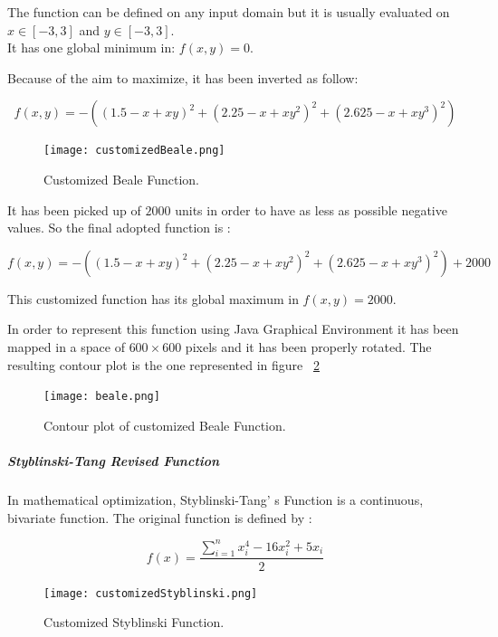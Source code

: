 The function can be defined on any input domain but it is usually evaluated on $x \in [-3, 3]$ and $y \in [-3, 3]$. \\

It has one global minimum in: $f(x, y) = 0$. 

Because of the aim to maximize, it has been inverted as follow:

\begin{equation}
f(x, y) = -((1.5 - x + xy)^2 + (2.25 - x + xy^2)^2 + (2.625 - x + xy^3)^2)
\end{equation}

\begin{figure}[h!]
	\centering
	\texttt{[image: customizedBeale.png]}
	\caption{Customized Beale Function.}
	\label{fig:CustomizedBealeFunction}
\end{figure}

It has been picked up of $2000$ units in order to have as less as possible negative values. So the final adopted function is :

\begin{equation}
f(x, y) = -((1.5 - x + xy)^2 + (2.25 - x + xy^2)^2 + (2.625 - x + xy^3)^2) + 2000
\end{equation}

This customized function has its global maximum in $f(x, y) = 2000$.

In order to represent this function using Java Graphical Environment it has been mapped in a space of $600 \times 600$ pixels and it has been properly rotated. The resulting contour plot is the one represented in figure ~\ref{fig:ContourPlotCustomizedBealeFunction} 

\begin{figure}[h!]
	\centering
	\texttt{[image: beale.png]}
	\caption{Contour plot of customized Beale Function.}
	\label{fig:ContourPlotCustomizedBealeFunction}
\end{figure}

\subparagraph{Styblinski-Tang Revised Function} In mathematical optimization, Styblinski-Tang' s Function is a continuous, bivariate function. The original function is defined by :

\begin{equation}
	f(x) = \dfrac{\sum_{i=1}^{n} x_{i}^4 -16x_{i}^2 +5x_{i}}{2}
\end{equation}

\begin{figure}[h!]
	\centering
	\texttt{[image: customizedStyblinski.png]}
	\caption{Customized Styblinski Function.}
	\label{fig:CustomizedStyblinskiFunction}
\end{figure}

